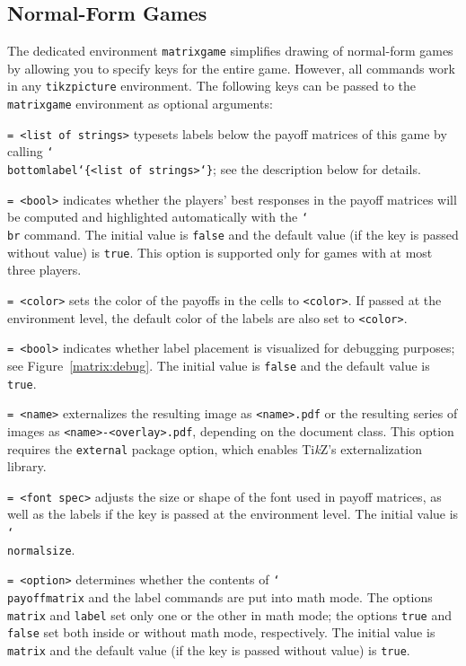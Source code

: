 \documentclass{article}
\newenvironment{desc}{\itemize[leftmargin=50pt]}{\enditemize}
\def\option#1#2{\item[\texttt{#1}] \hskip-1.5pt\texttt{#2}}
\renewcommand{\textbackslash}{\char`\\}
\def\cmd#1{\texttt{\color{cmd}\textbackslash#1}}
\def\leftbrace{\char`\{}
\def\rightbrace{\char`\}}
\def\arg#1{{\color{cmd}\leftbrace}{\color{black}#1}{\color{cmd}\rightbrace}}
\def\TikZ{Ti\emph{k}Z\xspace}
\begin{document}
\subsection{Normal-Form Games}\label{sec:Matrixgame}

The dedicated environment \texttt{matrixgame} simplifies drawing of normal-form games by allowing you to specify keys for the entire game. However, all commands work in any \texttt{tikzpicture} environment. The following keys can be passed to the \texttt{matrixgame} environment as optional arguments:


\begin{desc}
\option{bottom}{= <list of strings>} typesets labels below the payoff matrices of this game by calling \cmd{bottomlabel\arg{<list of strings>}}; see the description below for details.

\option{br}{= <bool>} indicates whether the players' best responses in the payoff matrices will be computed and highlighted automatically with the \cmd{br} command. The initial value is \texttt{false} and the default value (if the key is passed without value) is \texttt{true}. This option is supported only for games with at most three players. %

\option{color}{= <color>} sets the color of the payoffs in the cells to \texttt{<color>}. If passed at the environment level, the default color of the labels are also set to \texttt{<color>}. 

\option{debug}{= <bool>} indicates whether label placement is visualized for debugging purposes; see Figure~\ref{matrix:debug}. The initial value is \texttt{false} and the default value is \texttt{true}.

\option{external}{= <name>} externalizes the resulting image as \texttt{<name>.pdf} or the resulting series of images as \texttt{<name>-<overlay>.pdf}, depending on the document class. This option requires the \texttt{external} package option, which enables \TikZ's externalization library.

\option{font}{= <font spec>} adjusts the size or shape of the font used in payoff matrices, as well as the labels if the key is passed at the environment level. The initial value is \cmd{normalsize}.

\option{force math}{= <option>} determines whether the contents of \cmd{payoffmatrix} and the label commands are put into math mode. The options \texttt{matrix} and \texttt{label} set only one or the other in math mode; the options \texttt{true} and \texttt{false} set both inside or without math mode, respectively. The initial value is \texttt{matrix} and the default value (if the key is passed without value) is \texttt{true}.


\end{desc}
\end{document}

